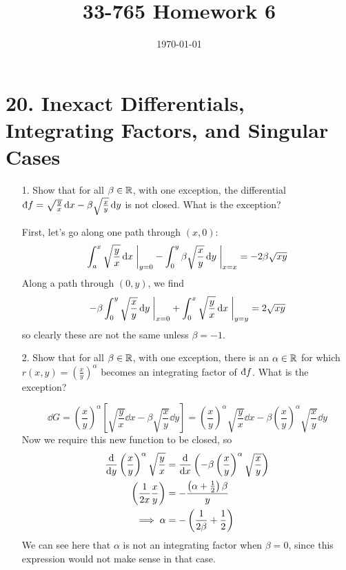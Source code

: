 \documentclass[a4paper,twoside]{article}
\title{33-765 Homework 6}
\date{\today}
\begin{document}
\maketitle

\section*{20. Inexact Differentials, Integrating Factors, and Singular Cases}
\begin{itemize}
    \item[1.] Show that for all $ \beta \in \mathbb{R} $, with one exception, the differential $ \dbar{f} = \sqrt{\frac{y}{x}} \dd{x} - \beta \sqrt{\frac{x}{y}} \dd{y} $ is not closed. What is the exception?
        \begin{problem}
            First, let's go along one path through $ (x,0) $:
            \begin{equation}
                \int_a^x \sqrt{\frac{y}{x}} \dd{x} \eval_{y=0} - \int_0^y \beta \sqrt{\frac{x}{y}} \dd{y} \eval_{x=x} = - 2 \beta \sqrt{xy}
            \end{equation}
            Along a path through $ (0,y) $, we find
            \begin{equation}
                - \beta \int_0^y \sqrt{\frac{x}{y}} \dd{y} \eval_{x=0} + \int_0^x \sqrt{\frac{y}{x}} \dd{x} \eval_{y=y} = 2 \sqrt{xy}
            \end{equation}
            so clearly these are not the same unless $ \beta = -1 $.
        \end{problem}
    \item[2.] Show that for all $ \beta \in \mathbb{R} $, with one exception, there is an $ \alpha \in \mathbb{R} $ for which $ r(x,y) = \left( \frac{x}{y} \right)^{\alpha} $ becomes an integrating factor of $ \dbar{f} $. What is the exception?
        \begin{problem}
            \begin{equation}
                \dd{G} = \left( \frac{x}{y} \right)^{\alpha} \left[ \sqrt{\frac{y}{x}} \dd{x} - \beta \sqrt{\frac{x}{y}} \dd{y} \right] = \left( \frac{x}{y} \right)^{\alpha} \sqrt{\frac{y}{x}} \dd{x} - \beta \left( \frac{x}{y} \right)^{\alpha} \sqrt{\frac{x}{y}} \dd{y}
            \end{equation}
            Now we require this new function to be closed, so
            \begin{align}
                \dv{y}\left( \frac{x}{y} \right)^{\alpha} \sqrt{\frac{y}{x}} &= \dv{x}\left( - \beta \left( \frac{x}{y} \right)^{\alpha} \sqrt{\frac{x}{y}} \right) \\
                \left( \frac{1}{2x} \frac{x}{y} \right) &= - \frac{\left( \alpha + \frac{1}{2} \right) \beta}{y} \\
                \implies \alpha &= - \left( \frac{1}{2 \beta} + \frac{1}{2} \right)
            \end{align}
            We can see here that $ \alpha $ is not an integrating factor when $ \beta = 0 $, since this expression would not make sense in that case.
        \end{problem}
\end{itemize}
\end{document}
